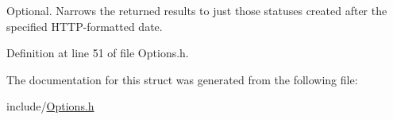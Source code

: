 Optional. Narrows the returned results to just those statuses created after the specified HTTP-formatted date. 



Definition at line 51 of file Options.h.

The documentation for this struct was generated from the following file:\begin{CompactItemize}
\item 
include/\hyperlink{Options_8h}{Options.h}\end{CompactItemize}
